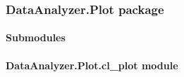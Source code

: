 \documentclass[letterpaper,10pt,english]{sphinxmanual}
\begin{document}
\subsubsection{DataAnalyzer.Plot package}
\label{\detokenize{DataAnalyzer.Plot:dataanalyzer-plot-package}}\label{\detokenize{DataAnalyzer.Plot::doc}}

\paragraph{Submodules}
\label{\detokenize{DataAnalyzer.Plot:submodules}}

\paragraph{DataAnalyzer.Plot.cl\_plot module}
\label{\detokenize{DataAnalyzer.Plot:module-DataAnalyzer.Plot.cl_plot}}\label{\detokenize{DataAnalyzer.Plot:dataanalyzer-plot-cl-plot-module}}
\end{document}
